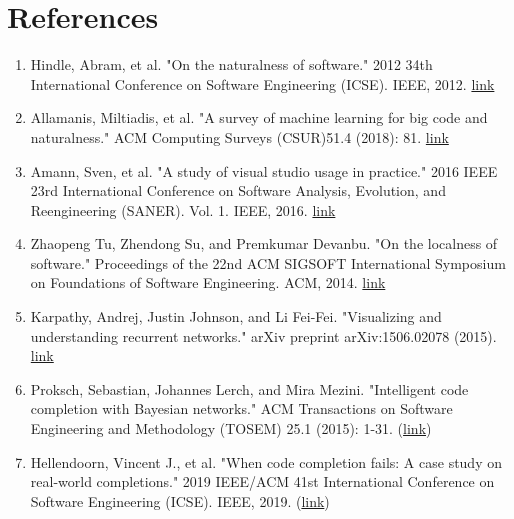 \section{References}
\begin{enumerate}
	\item Hindle, Abram, et al. "On the naturalness of software." 2012 34th International Conference on Software Engineering (ICSE). IEEE, 2012. \href{http://citeseerx.ist.psu.edu/viewdoc/download?doi=10.1.1.221.1261&rep=rep1&type=pdf}{link}
	\item Allamanis, Miltiadis, et al. "A survey of machine learning for big code and naturalness." ACM Computing Surveys (CSUR)51.4 (2018): 81. \href{https://arxiv.org/pdf/1709.06182.pdf}{link}
	\item Amann, Sven, et al. "A study of visual studio usage in practice." 2016 IEEE 23rd International Conference on Software Analysis, Evolution, and Reengineering (SANER). Vol. 1. IEEE, 2016. \href{https://sarahnadi.org/resources/pubs/Amann_SANER16.pdf}{link}
	\item Zhaopeng Tu, Zhendong Su, and Premkumar Devanbu. "On the localness of software." Proceedings of the 22nd ACM SIGSOFT International Symposium on Foundations of Software Engineering. ACM, 2014. \href{http://zptu.net/papers/fse2014_localness.pdf}{link}
	\item Karpathy, Andrej, Justin Johnson, and Li Fei-Fei. "Visualizing and understanding recurrent networks." arXiv preprint arXiv:1506.02078 (2015). \href{https://arxiv.org/pdf/1506.02078.pdf}{link}
	\item Proksch, Sebastian, Johannes Lerch, and Mira Mezini. "Intelligent code completion with Bayesian networks." ACM Transactions on Software Engineering and Methodology (TOSEM) 25.1 (2015): 1-31. (\href{https://ieeexplore.ieee.org/stamp/stamp.jsp?arnumber=8812116}{link})
	\item Hellendoorn, Vincent J., et al. "When code completion fails: A case study on real-world completions." 2019 IEEE/ACM 41st International Conference on Software Engineering (ICSE). IEEE, 2019. (\href{https://dl.acm.org/doi/pdf/10.1145/2744200}{link})
\end{enumerate}